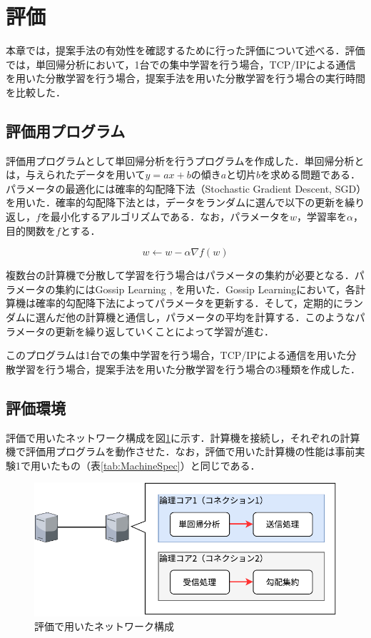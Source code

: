 \section{評価}
\label{sec:Evaluation}
本章では，提案手法の有効性を確認するために行った評価について述べる．評価では，単回帰分析において，1台での集中学習を行う場合，TCP/IPによる通信を用いた分散学習を行う場合，提案手法を用いた分散学習を行う場合の実行時間を比較した．

\subsection{評価用プログラム}
評価用プログラムとして単回帰分析を行うプログラムを作成した．単回帰分析とは，与えられたデータを用いて$y = ax + b$の傾き$a$と切片$b$を求める問題である．パラメータの最適化には確率的勾配降下法（Stochastic Gradient Descent, SGD）を用いた．確率的勾配降下法とは，データをランダムに選んで以下の更新を繰り返し，$f$を最小化するアルゴリズムである．なお，パラメータを$w$，学習率を$\alpha$，目的関数を$f$とする．

\begin{equation}
  w \leftarrow w - \alpha \nabla f(w)
\end{equation}

複数台の計算機で分散して学習を行う場合はパラメータの集約が必要となる．パラメータの集約にはGossip Learning \cite{Gossip1}, \cite{Gossip2} を用いた．Gossip Learningにおいて，各計算機は確率的勾配降下法によってパラメータを更新する．そして，定期的にランダムに選んだ他の計算機と通信し，パラメータの平均を計算する．このようなパラメータの更新を繰り返していくことによって学習が進む．

このプログラムは1台での集中学習を行う場合，TCP/IPによる通信を用いた分散学習を行う場合，提案手法を用いた分散学習を行う場合の3種類を作成した．

\subsection{評価環境}
評価で用いたネットワーク構成を図\ref{fig:Evaluation}に示す．計算機を接続し，それぞれの計算機で評価用プログラムを動作させた．なお，評価で用いた計算機の性能は事前実験1で用いたもの（表\ref{tab:MachineSpec}）と同じである．

\begin{figure}[htb]
  \centering
  \includegraphics[width=\columnwidth]{pictures/EvaluationNetwork.pdf}
  \caption{評価で用いたネットワーク構成}
  \label{fig:Evaluation}
\end{figure}

